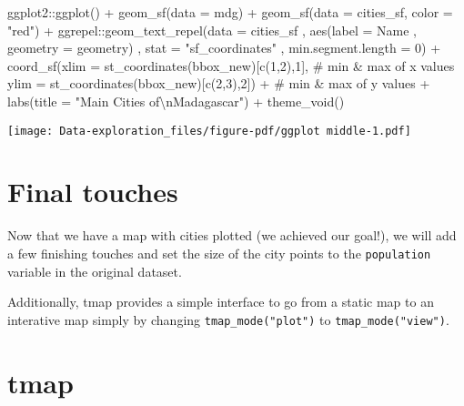 \documentclass[
  letterpaper,
  DIV=11,
  numbers=noendperiod]{scrreprt}
\newenvironment{Shaded}{\begin{snugshade}}{\end{snugshade}}
\newcommand{\AttributeTok}[1]{\textcolor[rgb]{0.40,0.45,0.13}{#1}}
\newcommand{\CommentTok}[1]{\textcolor[rgb]{0.37,0.37,0.37}{#1}}
\newcommand{\DecValTok}[1]{\textcolor[rgb]{0.68,0.00,0.00}{#1}}
\newcommand{\FunctionTok}[1]{\textcolor[rgb]{0.28,0.35,0.67}{#1}}
\newcommand{\NormalTok}[1]{\textcolor[rgb]{0.00,0.23,0.31}{#1}}
\newcommand{\SpecialCharTok}[1]{\textcolor[rgb]{0.37,0.37,0.37}{#1}}
\newcommand{\StringTok}[1]{\textcolor[rgb]{0.13,0.47,0.30}{#1}}
\begin{document}
\begin{Shaded}
\begin{Highlighting}[]
\NormalTok{ggplot2}\SpecialCharTok{::}\FunctionTok{ggplot}\NormalTok{() }\SpecialCharTok{+}
  \FunctionTok{geom\_sf}\NormalTok{(}\AttributeTok{data =}\NormalTok{ mdg) }\SpecialCharTok{+}
  \FunctionTok{geom\_sf}\NormalTok{(}\AttributeTok{data =}\NormalTok{ cities\_sf, }\AttributeTok{color =} \StringTok{"red"}\NormalTok{) }\SpecialCharTok{+}
\NormalTok{  ggrepel}\SpecialCharTok{::}\FunctionTok{geom\_text\_repel}\NormalTok{(}\AttributeTok{data =}\NormalTok{ cities\_sf}
\NormalTok{               , }\FunctionTok{aes}\NormalTok{(}\AttributeTok{label =}\NormalTok{ Name}
\NormalTok{                     , }\AttributeTok{geometry =}\NormalTok{ geometry)}
\NormalTok{               , }\AttributeTok{stat =} \StringTok{"sf\_coordinates"}
\NormalTok{               , }\AttributeTok{min.segment.length =} \DecValTok{0}\NormalTok{) }\SpecialCharTok{+}
  \FunctionTok{coord\_sf}\NormalTok{(}\AttributeTok{xlim =} \FunctionTok{st\_coordinates}\NormalTok{(bbox\_new)[}\FunctionTok{c}\NormalTok{(}\DecValTok{1}\NormalTok{,}\DecValTok{2}\NormalTok{),}\DecValTok{1}\NormalTok{], }\CommentTok{\# min \& max of x values}
           \AttributeTok{ylim =} \FunctionTok{st\_coordinates}\NormalTok{(bbox\_new)[}\FunctionTok{c}\NormalTok{(}\DecValTok{2}\NormalTok{,}\DecValTok{3}\NormalTok{),}\DecValTok{2}\NormalTok{]) }\SpecialCharTok{+} \CommentTok{\# min \& max of y values +}
  \FunctionTok{labs}\NormalTok{(}\AttributeTok{title =} \StringTok{"Main Cities of}\SpecialCharTok{\textbackslash{}n}\StringTok{Madagascar"}\NormalTok{) }\SpecialCharTok{+}
  \FunctionTok{theme\_void}\NormalTok{()}
\end{Highlighting}
\end{Shaded}

\texttt{[image: Data-exploration\_files/figure-pdf/ggplot middle-1.pdf]}

\section{Final touches}\label{final-touches}

Now that we have a map with cities plotted (we achieved our goal!), we
will add a few finishing touches and set the size of the city points to
the \texttt{population} variable in the original dataset.

Additionally, tmap provides a simple interface to go from a static map
to an interative map simply by changing \texttt{tmap\_mode("plot")} to
\texttt{tmap\_mode("view")}.

\section{tmap}
\end{document}
